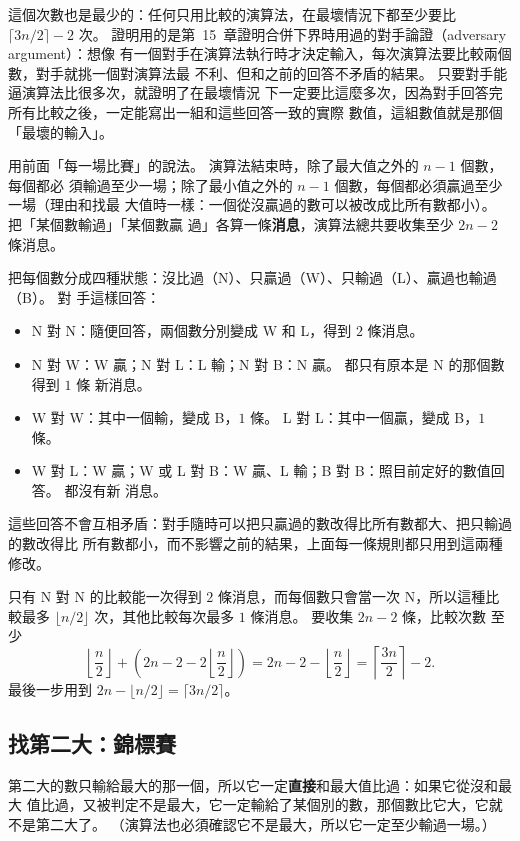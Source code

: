 這個次數也是最少的：任何只用比較的演算法，在最壞情況下都至少要比
$\lceil 3n/2 \rceil - 2$ 次。 證明用的是第~15~章證明合併下界時用過的對手論證（adversary argument）：想像
有一個對手在演算法執行時才決定輸入，每次演算法要比較兩個數，對手就挑一個對演算法最
不利、但和之前的回答不矛盾的結果。 只要對手能逼演算法比很多次，就證明了在最壞情況
下一定要比這麼多次，因為對手回答完所有比較之後，一定能寫出一組和這些回答一致的實際
數值，這組數值就是那個「最壞的輸入」。

\begin{whybox}[同時找最大最小的下界]
用前面「每一場比賽」的說法。 演算法結束時，除了最大值之外的 $n - 1$ 個數，每個都必
須輸過至少一場；除了最小值之外的 $n - 1$ 個數，每個都必須贏過至少一場（理由和找最
大值時一樣：一個從沒贏過的數可以被改成比所有數都小）。 把「某個數輸過」「某個數贏
過」各算一條\textbf{消息}，演算法總共要收集至少 $2n - 2$ 條消息。

把每個數分成四種狀態：沒比過（N）、只贏過（W）、只輸過（L）、贏過也輸過（B）。 對
手這樣回答：
\begin{itemize}
\item N 對 N：隨便回答，兩個數分別變成 W 和 L，得到 $2$ 條消息。
\item N 對 W：W 贏；N 對 L：L 輸；N 對 B：N 贏。 都只有原本是 N 的那個數得到 $1$ 條
新消息。
\item W 對 W：其中一個輸，變成 B，$1$ 條。 L 對 L：其中一個贏，變成 B，$1$ 條。
\item W 對 L：W 贏；W 或 L 對 B：W 贏、L 輸；B 對 B：照目前定好的數值回答。 都沒有新
消息。
\end{itemize}
這些回答不會互相矛盾：對手隨時可以把只贏過的數改得比所有數都大、把只輸過的數改得比
所有數都小，而不影響之前的結果，上面每一條規則都只用到這兩種修改。

只有 N 對 N 的比較能一次得到 $2$ 條消息，而每個數只會當一次 N，所以這種比較最多
$\lfloor n/2 \rfloor$ 次，其他比較每次最多 $1$ 條消息。 要收集 $2n - 2$ 條，比較次數
至少
\[
\left\lfloor \frac{n}{2} \right\rfloor + \left(2n - 2 - 2\left\lfloor \frac{n}{2} \right\rfloor\right)
= 2n - 2 - \left\lfloor \frac{n}{2} \right\rfloor
= \left\lceil \frac{3n}{2} \right\rceil - 2 .
\]
最後一步用到 $2n - \lfloor n/2 \rfloor = \lceil 3n/2 \rceil$。
\end{whybox}

\subsection{找第二大：錦標賽}

第二大的數只輸給最大的那一個，所以它一定\textbf{直接}和最大值比過：如果它從沒和最大
值比過，又被判定不是最大，它一定輸給了某個別的數，那個數比它大，它就不是第二大了。
（演算法也必須確認它不是最大，所以它一定至少輸過一場。）

